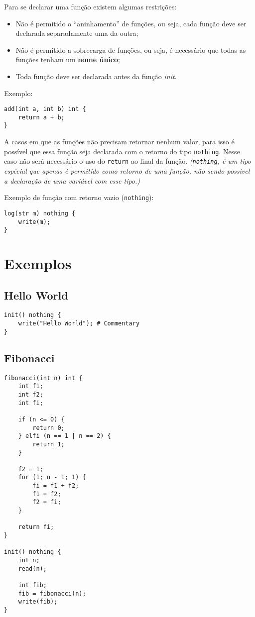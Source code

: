 \documentclass[a4paper,11pt]{article}
\begin{document}
Para se declarar uma função existem algumas restrições:
\begin{itemize}
    \item Não é permitido o ``aninhamento'' de funções, ou seja, cada função deve ser declarada
    separadamente uma da outra;
    \item Não é permitido a sobrecarga de funções, ou seja, é necessário que todas as funções
    tenham um \textbf{nome único};
    \item Toda função deve ser declarada antes da função \textit{init}.
\end{itemize}

Exemplo:
\begin{lstlisting}
add(int a, int b) int {
    return a + b;
}
\end{lstlisting}

A casos em que as funções não precisam retornar nenhum valor, para isso é possível que essa função
seja declarada com o retorno do tipo \texttt{nothing}. Nesse caso não será necessário o uso do
\texttt{return} ao final da função. \textit{(\texttt{nothing}, é um tipo espécial que apenas é
permitido como retorno de uma função, não sendo possível a declaração de uma variável com esse tipo.)}

Exemplo de função com retorno vazio (\texttt{nothing}):
\begin{lstlisting}
log(str m) nothing {
    write(m);
}
\end{lstlisting}

\section{Exemplos}

\subsection{Hello World}
\begin{lstlisting}
init() nothing {
    write("Hello World"); # Commentary
}
\end{lstlisting}

\subsection{Fibonacci}
\begin{lstlisting}
fibonacci(int n) int {
    int f1;
    int f2;
    int fi;

    if (n <= 0) {
        return 0;
    } elfi (n == 1 | n == 2) {
        return 1;
    }

    f2 = 1;
    for (1; n - 1; 1) {
        fi = f1 + f2;
        f1 = f2;
        f2 = fi;
    }

    return fi;
}

init() nothing {
    int n;
    read(n);
    
    int fib;
    fib = fibonacci(n);
    write(fib);
}
\end{lstlisting}
\end{document}
